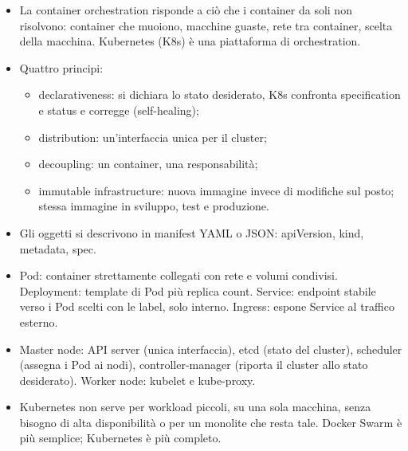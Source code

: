 \begin{puntichiave}
\begin{itemize}
  \item La container orchestration risponde a ciò che i container da soli non risolvono: container che muoiono,
    macchine guaste, rete tra container, scelta della macchina. Kubernetes (K8s) è una piattaforma di orchestration.
  \item Quattro principi:
    \begin{itemize}
      \item declarativeness: si dichiara lo stato desiderato, K8s confronta specification e status e corregge
        (self-healing);
      \item distribution: un'interfaccia unica per il cluster;
      \item decoupling: un container, una responsabilità;
      \item immutable infrastructure: nuova immagine invece di modifiche sul posto; stessa immagine in sviluppo, test e
        produzione.
    \end{itemize}
  \item Gli oggetti si descrivono in manifest YAML o JSON: apiVersion, kind, metadata, spec.
  \item Pod: container strettamente collegati con rete e volumi condivisi. Deployment: template di Pod più replica
    count. Service: endpoint stabile verso i Pod scelti con le label, solo interno. Ingress: espone Service al
    traffico esterno.
  \item Master node: API server (unica interfaccia), etcd (stato del cluster), scheduler (assegna i Pod ai nodi),
    controller-manager (riporta il cluster allo stato desiderato). Worker node: kubelet e kube-proxy.
  \item Kubernetes non serve per workload piccoli, su una sola macchina, senza bisogno di alta disponibilità o per un
    monolite che resta tale. Docker Swarm è più semplice; Kubernetes è più completo.
\end{itemize}
\end{puntichiave}


